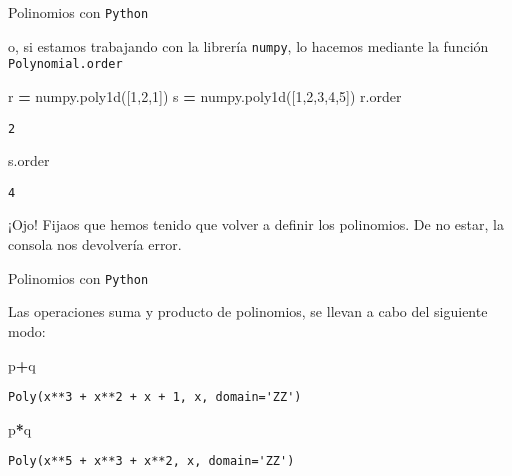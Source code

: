 \documentclass[
  ignorenonframetext,
]{beamer}
\newenvironment{Shaded}{\begin{snugshade}}{\end{snugshade}}
\newcommand{\DecValTok}[1]{\textcolor[rgb]{0.00,0.00,0.81}{#1}}
\newcommand{\NormalTok}[1]{#1}
\newcommand{\OperatorTok}[1]{\textcolor[rgb]{0.81,0.36,0.00}{\textbf{#1}}}
\begin{document}
\begin{frame}[fragile]{Polinomios con \texttt{Python}}
\protect\hypertarget{polinomios-con-python-6}{}

o, si estamos trabajando con la librería \texttt{numpy}, lo hacemos
mediante la función \texttt{Polynomial.order}

\begin{Shaded}
\begin{Highlighting}[]
\NormalTok{r }\OperatorTok{=}\NormalTok{ numpy.poly1d([}\DecValTok{1}\NormalTok{,}\DecValTok{2}\NormalTok{,}\DecValTok{1}\NormalTok{]) }
\NormalTok{s }\OperatorTok{=}\NormalTok{ numpy.poly1d([}\DecValTok{1}\NormalTok{,}\DecValTok{2}\NormalTok{,}\DecValTok{3}\NormalTok{,}\DecValTok{4}\NormalTok{,}\DecValTok{5}\NormalTok{])}
\NormalTok{r.order}
\end{Highlighting}
\end{Shaded}

\begin{verbatim}
2
\end{verbatim}

\begin{Shaded}
\begin{Highlighting}[]
\NormalTok{s.order}
\end{Highlighting}
\end{Shaded}

\begin{verbatim}
4
\end{verbatim}

¡Ojo! Fijaos que hemos tenido que volver a definir los polinomios. De no
estar, la consola nos devolvería error.

\end{frame}

\begin{frame}[fragile]{Polinomios con \texttt{Python}}
\protect\hypertarget{polinomios-con-python-7}{}

Las operaciones suma y producto de polinomios, se llevan a cabo del
siguiente modo:

\begin{Shaded}
\begin{Highlighting}[]
\NormalTok{p}\OperatorTok{+}\NormalTok{q }
\end{Highlighting}
\end{Shaded}

\begin{verbatim}
Poly(x**3 + x**2 + x + 1, x, domain='ZZ')
\end{verbatim}

\begin{Shaded}
\begin{Highlighting}[]
\NormalTok{p}\OperatorTok{*}\NormalTok{q }
\end{Highlighting}
\end{Shaded}

\begin{verbatim}
Poly(x**5 + x**3 + x**2, x, domain='ZZ')
\end{verbatim}

\end{frame}
\end{document}
